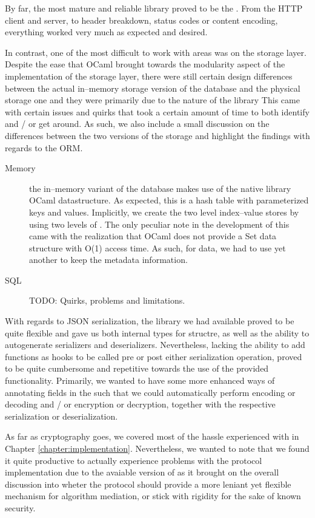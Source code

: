By far, the most mature and reliable library proved to be the .
From the HTTP client and server, to header breakdown, status codes or content encoding, everything worked very much as expected and desired.

In contrast, one of the most difficult to work with areas was on the storage layer.
Despite the ease that OCaml brought towards the modularity aspect of the implementation of the storage layer, there were still certain design differences between the actual in--memory storage version of the database and the physical storage one and they were primarily due to the nature of the  library
This came with certain issues and quirks that took a certain amount of time to both identify and / or get around.
As such, we also include a small discussion on the differences between the two versions of the storage and highlight the findings with regards to the ORM.
\begin{description}
  \item[Memory] the in--memory variant of the database makes use of the native library OCaml  datastructure.
  As expected, this is a hash table with parameterized keys and values.
  Implicitly, we create the two level index--value stores by using two levels of .
  The only peculiar note in the development of this came with the realization that OCaml does not provide a Set data structure with O(1) access time.
  As such, for  data, we had to use yet another  to keep the metadata information.

  \item[SQL] TODO: Quirks, problems and limitations.
\end{description}

With regards to JSON serialization, the library we had available proved to be quite flexible and gave us both internal types for structre, as well as the ability to autogenerate serializers and deserializers.
Nevertheless, lacking the ability to add functions as hooks to be called pre or post either serialization operation, proved to be quite cumbersome and repetitive towards the use of the provided functionality.
Primarily, we wanted to have some more enhanced ways of annotating fields in the  such that we could automatically perform encoding or decoding and / or encryption or decryption, together with the respective serialization or deserialization.

As far as cryptography goes, we covered most of the hassle experienced with  in Chapter \ref{chapter:implementation}.
Nevertheless, we wanted to note that we found it quite productive to actually experience problems with the protocol implementation due to the avaiable version of  as it brought on the overall discussion into wheter the protocol should provide a more leniant yet flexible mechanism for algorithm mediation, or stick with rigidity for the sake of known security.

